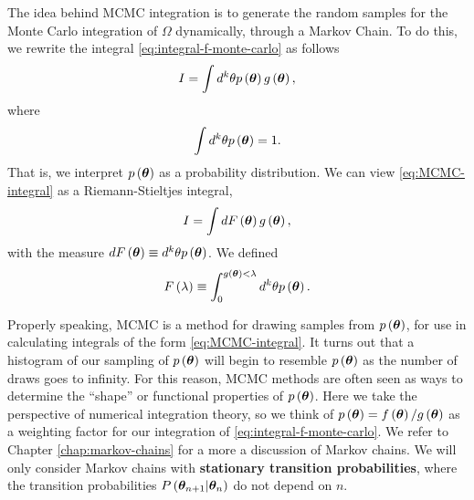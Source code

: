 The idea behind MCMC integration 
is to generate the random samples for the Monte Carlo
integration of $\Omega$ dynamically, through a Markov Chain. 
To do this, we rewrite the integral \eqref{eq:integral-f-monte-carlo} as follows
\begin{align}
    \label{eq:MCMC-integral}
    I
    =
    \int d^k\theta p\left({\bm \theta}\right)g\left({\bm \theta}\right) 
    ,
\end{align}
where
\begin{align}
    \int d^k\theta p\left({\bm \theta}\right)
    =
    1
    .
\end{align}
That is, we interpret $p\left({\bm \theta}\right)$ as a probability distribution.
We can view \eqref{eq:MCMC-integral} as a Riemann-Stieltjes integral,
\begin{align}
    \label{eq:riemann-steiltjes-integral}
    I
    =
    \int dF\left({\bm \theta}\right) g\left({\bm \theta}\right)
    ,
\end{align}
with the measure $dF\left({\bm \theta}\right) \equiv d^k\theta p\left({\bm \theta}\right)$.
We defined
\begin{align}
    \label{eq:F-RS-int}
    F\left(\lambda\right)
    \equiv
    \int_0^{g\left({\bm \theta}\right)<\lambda} d^k\theta p\left({\bm \theta}\right)
    .
\end{align}

Properly speaking, MCMC is a method for drawing samples from $p\left({\bm \theta}\right)$, for use in calculating integrals of the form \eqref{eq:MCMC-integral}.
It turns out that a histogram of our sampling of $p\left({\bm \theta}\right)$ will
begin to resemble $p\left({\bm \theta}\right)$ as the number of draws goes to infinity.
For this reason, MCMC methods are often seen as ways to determine the ``shape''
or functional properties of $p\left({\bm \theta}\right)$.
Here we take the perspective of numerical integration theory, so we think of 
$p\left({\bm \theta}\right) = f\left({\bm \theta}\right)/g\left({\bm \theta}\right)$ 
as a weighting factor for our integration of \eqref{eq:integral-f-monte-carlo}. 
We refer to Chapter \ref{chap:markov-chains} for a more a discussion of Markov chains.
We will only consider Markov chains with \textbf{stationary transition probabilities}, where the transition probabilities $P\left({\bm \theta}_{n+1}|{\bm \theta}_n\right)$ do not depend on $n$.

